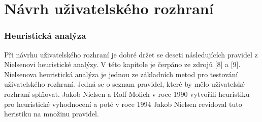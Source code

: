 \documentclass[thesis=M,czech]{FITthesis}[2012/06/26]
\begin{document}
\chapter{Návrh uživatelského rozhraní}

\subsection{}

\subsection{Heuristická analýza}
Při návrhu uživatelského rozhraní je dobré držet se deseti následujících pravidel z Nielsenovi heuristické analýzy. V této kapitole je čerpáno ze zdrojů [8] a [9]. Nielsenova heuristická analýza je jednou ze základních metod pro testování uživatelského rozhraní. Jedná se o seznam pravidel, které by mělo uživatelské rozhraní splňovat. Jakob Nielsen a Rolf Molich v roce 1990 vytvořili heuristiku
pro heuristické vyhodnocení a poté v roce 1994 Jakob Nielsen revidoval tuto heristiku na množinu pravidel.
\end{document}
